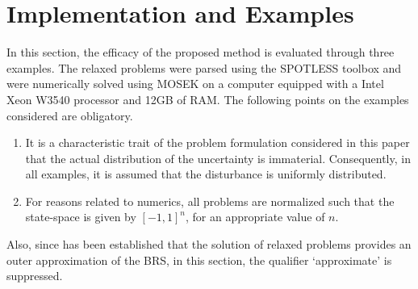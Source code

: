   \section{Implementation and Examples}
  In this section, the efficacy of the proposed method is evaluated through three examples. The relaxed problems were parsed using the SPOTLESS toolbox and were numerically solved using MOSEK on a computer equipped with a Intel Xeon W3540 processor and 12GB of RAM.
  The following points on the examples considered are obligatory.
  \begin{enumerate}
    \item It is a characteristic trait of the problem formulation considered in this paper that the actual distribution of the uncertainty is immaterial. Consequently, in all examples, it is assumed that the disturbance is uniformly distributed.
    \item For reasons related to numerics, all problems are normalized such that the state-space is given by $[-1,1]^n$, for an appropriate value of $n$.
  \end{enumerate}
  Also, since has been established that the solution of relaxed problems provides an outer approximation of the BRS, in this section, the qualifier `approximate' is suppressed.
